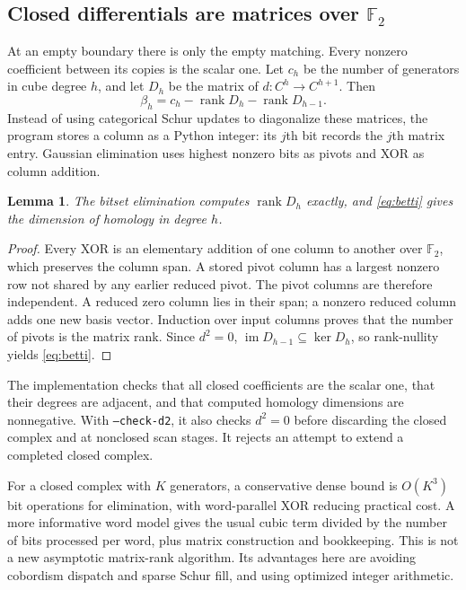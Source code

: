 \documentclass[11pt]{article}
\newtheorem{lemma}[theorem]{Lemma}
\theoremstyle{remark}\newtheorem{remark}[theorem]{Remark}
\newcommand{\F}{\mathbb F}
\newcommand{\rank}{\operatorname{rank}}
\begin{document}
\subsection{Closed differentials are matrices over \texorpdfstring{$\F_2$}{F2}}
At an empty boundary there is only the empty matching. Every nonzero
coefficient between its copies is the scalar one. Let $c_h$ be the number
of generators in cube degree $h$, and let $D_h$ be the matrix of
$d:C^h\to C^{h+1}$. Then
\begin{equation}\label{eq:betti}
 \beta_h=c_h-\rank D_h-\rank D_{h-1}.
\end{equation}
Instead of using categorical Schur updates to diagonalize these matrices,
the program stores a column as a Python integer: its $j$th bit records the
$j$th matrix entry. Gaussian elimination uses highest nonzero bits as
pivots and XOR as column addition.

\begin{lemma}
The bitset elimination computes $\rank D_h$ exactly, and
\eqref{eq:betti} gives the dimension of homology in degree $h$.
\end{lemma}
\begin{proof}
Every XOR is an elementary addition of one column to another over $\F_2$,
which preserves the column span. A stored pivot column has a largest
nonzero row not shared by any earlier reduced pivot. The pivot columns
are therefore independent. A reduced zero column lies in their span;
a nonzero reduced column adds one new basis vector. Induction over input
columns proves that the number of pivots is the matrix rank. Since
$d^2=0$, $\operatorname{im}D_{h-1}\subseteq\ker D_h$, so rank-nullity yields
\eqref{eq:betti}.
\end{proof}

The implementation checks that all closed coefficients are the scalar
one, that their degrees are adjacent, and that computed homology dimensions
are nonnegative. With \texttt{--check-d2}, it also checks $d^2=0$ before
discarding the closed complex and at nonclosed scan stages. It rejects an
attempt to extend a completed closed complex.

For a closed complex with $K$ generators, a conservative dense bound is
$O(K^3)$ bit operations for elimination, with word-parallel XOR reducing
practical cost. A more informative word model gives the usual cubic
term divided by the number of bits processed per word, plus matrix
construction and bookkeeping. This is not a new asymptotic matrix-rank
algorithm. Its advantages here are avoiding cobordism dispatch and sparse
Schur fill, and using optimized integer arithmetic.
\end{document}
